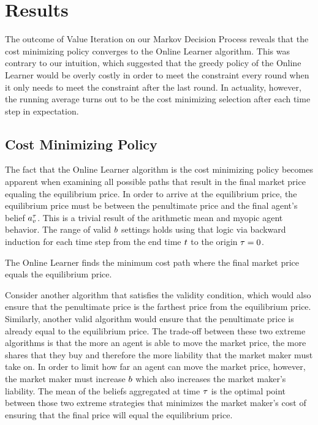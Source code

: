 \section{Results}
The outcome of Value Iteration on our Markov Decision Process reveals that the cost minimizing policy converges to the Online Learner algorithm. This was contrary to our intuition, which suggested that the greedy policy of the Online Learner would be overly costly in order to meet the constraint every round when it only needs to meet the constraint after the last round. In actuality, however, the running average turns out to be the cost minimizing selection after each time step in expectation. \\

\subsection{Cost Minimizing Policy}
The fact that the Online Learner algorithm is the cost minimizing policy becomes apparent when examining all possible paths that result in the final market price equaling the equilibrium price. In order to arrive at the equilibrium price, the equilibrium price must be between the penultimate price and the final agent's belief $a^{\tau}_v$. This is a trivial result of the arithmetic mean and myopic agent behavior. The range of valid $b$ settings holds using that logic via backward induction for each time step from the end time $t$ to the origin $\tau=0$. \\

\begin{conjecture}
The Online Learner finds the minimum cost path where the final market price equals the equilibrium price.
\end{conjecture}

Consider another algorithm that satisfies the validity condition, which would also ensure that the penultimate price is the farthest price from the equilibrium price. Similarly, another valid algorithm would ensure that the penultimate price is already equal to the equilibrium price. The trade-off between these two extreme algorithms is that the more an agent is able to move the market price, the more shares that they buy and therefore the more liability that the market maker must take on. In order to limit how far an agent can move the market price, however, the market maker must increase $b$ which also increases the market maker's liability. The mean of the beliefs aggregated at time $\tau$ is the optimal point between those two extreme strategies that minimizes the market maker's cost of ensuring that the final price will equal the equilibrium price.\\

